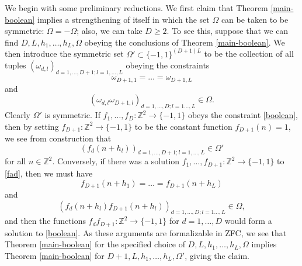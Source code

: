 \documentclass[reqno,a4paper,12pt]{amsart}
\numberwithin{equation}{section}
\numberwithin{figure}{section}
\def\Z{\mathbb{Z}}
\renewcommand\geq{\geqslant}
\theoremstyle{plain}
\theoremstyle{definition}
\begin{document}
We begin with some preliminary reductions.  We first claim that Theorem \ref{main-boolean} implies a strengthening of itself in which the set $\Omega$ can be taken to be symmetric: $\Omega = -\Omega$; also, we can take $D \geq 2$.  To see this, suppose that we can find $D,L,h_1,\dots,h_L,\Omega$ obeying the conclusions of Theorem \ref{main-boolean}.  We then introduce the symmetric set $\Omega' \subset \{-1,1\}^{(D+1)L}$ to be the collection of all tuples $(\omega_{d,l})_{d=1,\dots,D+1; l=1,\dots,L}$ obeying the constraints
$$
\omega_{D+1,1} = \dots = \omega_{D+1,L}$$
and
$$ (\omega_{d,l} \omega_{D+1,l})_{d=1,\dots,D;l=1\dots,L} \in \Omega.$$
Clearly $\Omega'$ is symmetric.  If $f_1,\dots,f_D \colon \Z^2 \to \{-1,1\}$ obeys the constraint \eqref{boolean}, then by setting $f_{D+1} \colon \Z^2 \to \{-1,1\}$ to be the constant function $f_{D+1}(n)=1$, we see from construction that
\begin{equation}\label{fad}
(f_d(n+h_l))_{d=1,\dots,D+1; l=1,\dots,L} \in \Omega'
\end{equation}
for all $n \in \Z^2$.  Conversely, if there was a solution $f_1,\dots,f_{D+1} \colon \Z^2 \to \{-1,1\}$ to \eqref{fad}, then we must have
$$ f_{D+1}(n+h_1) = \dots = f_{D+1}(n+h_L)$$
and
$$ (f_d(n+h_l) f_{D+1}(n+h_l))_{d=1,\dots,D;l=1\dots,L} \in \Omega,$$
and then the functions $f_d f_{D+1} \colon \Z^2 \to \{-1,1\}$ for $d=1,\dots,D$ would form a  solution to \eqref{boolean}.  As these arguments are formalizable in ZFC, we see that Theorem \ref{main-boolean} for the specified choice of $D,L,h_1,\dots,h_L,\Omega$ implies Theorem \ref{main-boolean} for $D+1,L,h_1,\dots,h_L,\Omega'$, giving the claim.
\end{document}
